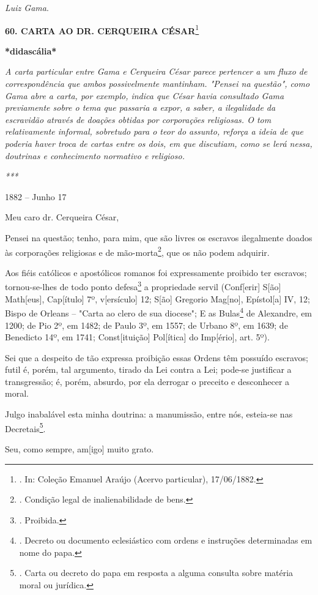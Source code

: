 \emph{Luiz Gama}.

\textbf{60. CARTA AO DR. CERQUEIRA CÉSAR}\footnote{. In: Coleção Emanuel
  Araújo (Acervo particular), 17/06/1882.}

\textbf{*didascália*}

\emph{A carta particular entre Gama e Cerqueira César parece pertencer a
um fluxo de correspondência que ambos possivelmente mantinham. "Pensei
na questão", como Gama abre a carta, por exemplo, indica que César havia
consultado Gama previamente sobre o tema que passaria a expor, a saber,
a ilegalidade da escravidão através de doações obtidas por corporações
religiosas. O tom relativamente informal, sobretudo para o teor do
assunto, reforça a ideia de que poderia haver troca de cartas entre os
dois, em que discutiam, como se lerá nessa, doutrinas e conhecimento
normativo e religioso. }

\emph{***}

1882 -- Junho 17

Meu caro dr. Cerqueira César,

Pensei na questão; tenho, para mim, que são livres os escravos
ilegalmente doados às corporações religiosas e de mão-morta\footnote{.
  Condição legal de inalienabilidade de bens.}, que os não podem
adquirir.

Aos fiéis católicos e apostólicos romanos foi expressamente proibido ter
escravos; tornou-se-lhes de todo ponto {defesa}\footnote{. Proibida.} {a
propriedade servil} (Conf{[}erir{]} S{[}ão{]} Math{[}eus{]},
Cap{[}ítulo{]} 7º, v{[}ersículo{]} 12; S{[}ão{]} Gregorio Mag{[}no{]},
Epístol{[}a{]} IV, 12; Bispo de Orleans -- "Carta ao clero de sua
diocese"; E as Bulas\footnote{. Decreto ou documento eclesiástico com
  ordens e instruções determinadas em nome do papa.} de Alexandre, em
1200; de Pio 2º, em 1482; de Paulo 3º, em 1557; de Urbano 8º, em 1639;
de Benedicto 14º, em 1741; Const{[}ituição{]} Pol{[}ítica{]} do
Imp{[}ério{]}, art. 5º).

Sei que a despeito de tão expressa proibição essas Ordens têm possuído
escravos; futil é, porém, tal argumento, tirado da Lei contra a Lei;
pode-se justificar a transgressão; é, porém, absurdo, por ela derrogar o
preceito e desconhecer a moral.

Julgo inabalável esta minha doutrina: a manumissão, entre nós, esteia-se
nas Decretais\footnote{. Carta ou decreto do papa em resposta a alguma
  consulta sobre matéria moral ou jurídica.}.

Seu, como sempre, am{[}igo{]} muito grato.

